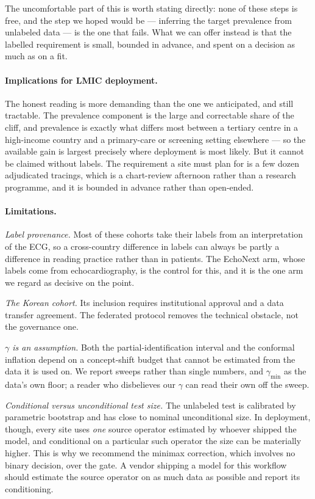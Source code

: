 The uncomfortable part of this is worth stating directly: none of these steps is
free, and the step we hoped would be --- inferring the target prevalence from
unlabeled data --- is the one that fails.  What we can offer instead is that the
labelled requirement is small, bounded in advance, and spent on a decision as
much as on a fit.

\paragraph{Implications for LMIC deployment.}
The honest reading is more demanding than the one we anticipated, and still
tractable.  The prevalence component is the large and correctable share of the
cliff, and prevalence is exactly what differs most between a tertiary centre in
a high-income country and a primary-care or screening setting elsewhere --- so
the available gain is largest precisely where deployment is most likely.  But it
cannot be claimed without labels.  The requirement a site must plan for is a
few dozen adjudicated tracings, which is a chart-review afternoon rather than a
research programme, and it is bounded in advance rather than open-ended.

\paragraph{Limitations.}
\emph{Label provenance.}  Most of these cohorts take their labels from an
interpretation of the ECG, so a cross-country difference in labels can always
be partly a difference in reading practice rather than in patients.  The
EchoNext arm, whose labels come from echocardiography, is the control for this,
and it is the one arm we regard as decisive on the point.

\emph{The Korean cohort.}  Its inclusion requires institutional approval and a
data transfer agreement.  The federated protocol removes the technical
obstacle, not the governance one.

\emph{$\gamma$ is an assumption.}  Both the partial-identification interval and
the conformal inflation depend on a concept-shift budget that cannot be
estimated from the data it is used on.  We report sweeps rather than single
numbers, and $\gamma_{\min}$ as the data's own floor; a reader who disbelieves
our $\gamma$ can read their own off the sweep.

\emph{Conditional versus unconditional test size.}  The unlabeled test is
calibrated by parametric bootstrap and has close to nominal unconditional size.
In deployment, though, every site uses \emph{one} source operator estimated by
whoever shipped the model, and conditional on a particular such operator the
size can be materially higher.  This is why we recommend the minimax
correction, which involves no binary decision, over the gate.  A vendor
shipping a model for this workflow should estimate the source operator on as
much data as possible and report its conditioning.

